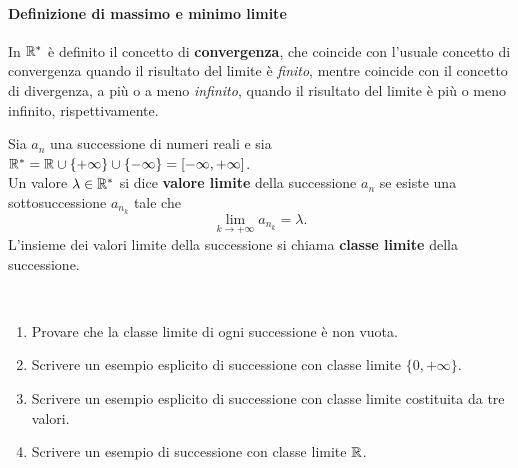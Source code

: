 \paragraph{Definizione di massimo e minimo limite}
\begin{remember}
In $\mathbb{R}^{\ast}$ è definito il concetto di \textbf{convergenza}, che coincide con l'usuale concetto di convergenza quando il risultato del limite è \textit{finito}, mentre coincide con il concetto di divergenza, a più o a meno \textit{infinito}, quando il risultato del limite è più o meno infinito, rispettivamente.
\end{remember}
\begin{define}
	Sia $a_n$ una successione di numeri reali e sia $\mathbb{R}^{\ast}=\mathbb{R}\cup \{+\infty\}\cup \{-\infty\}=\left[-\infty,+\infty\right]$.\\
	Un valore $\lambda\in \mathbb{R}^{\ast}$ si dice \textbf{valore limite} della successione $a_n$ se esiste una sottosuccessione $a_{n_k}$ tale che
	\begin{equation}
		\lim_{k\to +\infty} a_{n_k}=\lambda.
	\end{equation}
L'insieme dei valori limite della successione si chiama \textbf{classe limite} della successione.
\end{define}
\begin{exercises}~
	\begin{enumerate}
		\item Provare che la classe limite di ogni successione è non vuota.
		\item Scrivere un esempio esplicito di successione con classe limite $\{0, +\infty \}$.
		\item Scrivere un esempio esplicito di successione con classe limite costituita da tre valori.
		\item Scrivere un esempio di successione con classe limite $\mathbb{R}$.
	\end{enumerate}
\end{exercises}
